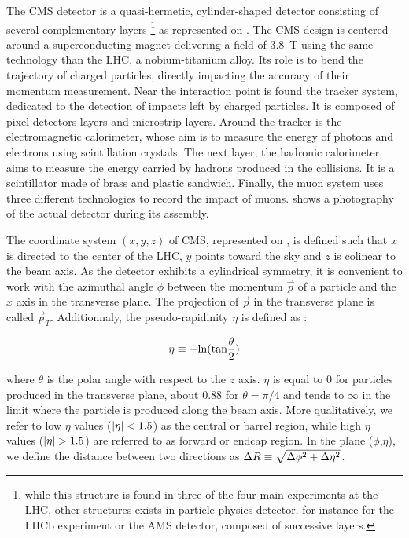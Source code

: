         The CMS detector is a quasi-hermetic, cylinder-shaped detector consisting of
        several complementary layers
        \footnote{while this structure is found in three of the four
        main experiments at the LHC, other structures exists in particle physics detector,
        for instance for the LHCb experiment or the AMS detector, composed of successive
        layers.}
        as represented on .
        The CMS design is centered around a superconducting magnet delivering a field of 3.8~T
        using the same technology than the LHC, a nobium-titanium alloy. Its role is to
        bend the trajectory of charged particles, directly impacting the accuracy of
        their momentum measurement. Near the interaction point is found the tracker system, dedicated to
        the detection of impacts left by charged particles. It is composed of pixel detectors
        layers and microstrip layers. Around the tracker is the electromagnetic
        calorimeter, whose aim is to measure the energy of photons and electrons using
        scintillation crystals. The next layer, the hadronic calorimeter, aims to measure
        the energy carried by hadrons produced in the collisions. It is a scintillator made
        of brass and plastic sandwich. Finally, the muon system uses three different
        technologies to record the impact of muons. 
        shows a photography of the actual detector during its assembly.


        The coordinate system $(x,y,z)$ of CMS, represented on ,
        is defined such that $x$ is directed to the center of the LHC, $y$ points toward
        the sky and $z$ is colinear to the beam axis. As the detector exhibits a
        cylindrical symmetry, it is convenient to work with the azimuthal angle $\phi$
        between the momentum $\vec{p}$ of a particle and the $x$ axis in the transverse
        plane. The projection of $\vec{p}$ in the transverse plane is called $\vec{p}_T$.
        Additionnaly, the pseudo-rapidinity $\eta$ is defined as :

        $$ \eta \equiv - \text{ln}(\text{tan}\frac{\theta}{2}) $$

        where $\theta$ is the polar angle with respect to the $z$ axis. $\eta$ is equal
        to 0 for particles produced in
        the transverse plane, about 0.88 for $\theta = \pi/4$ and tends to $\infty$ in the
        limit where the particle is produced along the beam axis. More qualitatively, we
        refer to low $\eta$ values ($\left| \eta \right| < 1.5$) as the central or barrel region, while
        high $\eta$ values ($\left| \eta \right| > 1.5$) are referred to as forward or endcap region.
        In the plane ($\phi$,$\eta$), we define the distance between two directions as
        $\Delta R \equiv \sqrt{\Delta\phi^2 + \Delta \eta^2}$.

